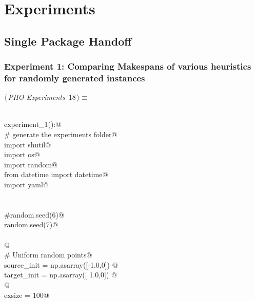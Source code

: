 \documentclass[10.0pt]{report}
\begin{document}
\chapter{Experiments}


\section{Single Package Handoff}

\subsection{Experiment 1: Comparing Makespans of various heuristics for randomly generated instances}



\begin{flushleft} \small
\begin{minipage}{\linewidth}\label{scrap9}\raggedright\small
{} $\langle\,${\itshape PHO Experiments}\nobreak\ {\footnotesize {18}}$\,\rangle\equiv$
\vspace{-1ex}
\begin{list}{}{} \item
\mbox{}\verb@@\\
\mbox{}\verb@def experiment_1():@\\
\mbox{}\verb@    # generate the experiments folder@\\
\mbox{}\verb@    import shutil@\\
\mbox{}\verb@    import os@\\
\mbox{}\verb@    import random@\\
\mbox{}\verb@    from datetime import datetime@\\
\mbox{}\verb@    import yaml@\\
\mbox{}\verb@@\\
\mbox{}\verb@@\\
\mbox{}\verb@    #random.seed(6)@\\
\mbox{}\verb@    random.seed(7)@\\
\mbox{}\verb@@\\
\mbox{}\verb@   @\\
\mbox{}\verb@    # Uniform random points@\\
\mbox{}\verb@    source_init  = np.asarray([-1.0,0]) @\\
\mbox{}\verb@    target_init  = np.asarray([ 1.0,0]) @\\
\mbox{}\verb@    @\\
\mbox{}\verb@    exsize = 100@\\

\end{list}
\end{minipage}
\end{flushleft}
\end{document}
